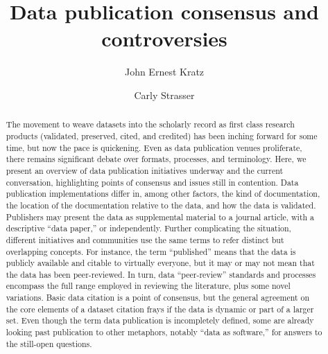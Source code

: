 \documentclass[10pt,twocolumn]{article}
\begin{document}
\title{Data publication consensus and controversies}
\author[1]{John Ernest Kratz}
\author[1]{Carly Strasser}

\maketitle
\thispagestyle{fancy}


\begin{abstract}


The movement to weave datasets into the scholarly record as first class research products (validated, preserved, cited, and credited) has been inching forward for some time, but now the pace is quickening.
Even as data publication venues proliferate, there remains significant debate over formats, processes, and terminology.
Here, we present an overview of data publication initiatives underway and the current conversation, highlighting points of consensus and issues still in contention.
Data publication implementations differ in, among other factors, the kind of documentation, the location of the documentation relative to the data, and how the data is validated.
Publishers may present the data as supplemental material to a journal article, with a descriptive ``data paper,'' or independently.
Further complicating the situation, different initiatives and communities use the same terms to refer distinct but overlapping concepts.
For instance, the term ``published'' means that the data is publicly available and citable to virtually everyone, but it may or may not mean that the data has been peer-reviewed.
In turn, data ``peer-review'' standards and processes encompass the full range employed in reviewing the literature, plus some novel variations.
Basic data citation is a point of consensus, but the general agreement on the core elements of a dataset citation frays if the data is dynamic or part of a larger set.
Even though the term data publication is incompletely defined, some are already looking past publication to other metaphors, notably ``data as software,'' for answers to the still-open questions.

\end{abstract}
\clearpage
\end{document}
